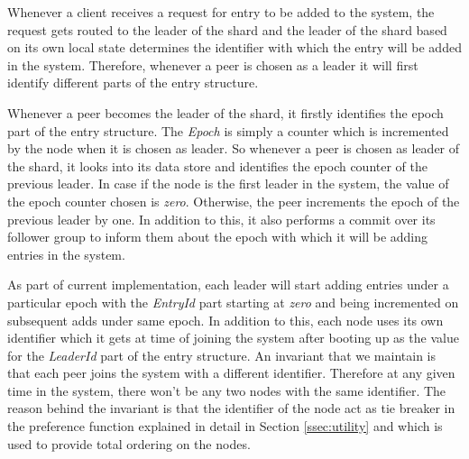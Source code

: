 \documentclass[a4paper,11pt]{kth-mag}
\begin{document}
Whenever a client receives a request for entry to be added to the system, the request gets routed to the leader of the shard and the leader of the shard based on its own local state determines the identifier with which the entry will be added in the system. Therefore, whenever a peer is chosen as a leader it will first identify different parts of the entry structure.
\par Whenever a peer becomes the leader of the shard, it firstly identifies the epoch part of the entry structure. The \textit{Epoch} is simply a counter which is incremented by the node when it is chosen as leader. So whenever a peer is chosen as leader of the shard, it looks into its data store and identifies the epoch counter of the previous leader. In case if the node is the first leader in the system, the value of the epoch counter chosen is \textit{zero}. Otherwise, the peer increments the epoch of the previous leader by one. In addition to this, it also performs a commit over its follower group to inform them about the epoch with which it will be adding entries in the system.
\par As part of current implementation, each leader will start adding entries under a particular epoch with the \textit{EntryId} part starting at \textit{zero} and being incremented on subsequent adds under same epoch. In addition to this, each node uses its own identifier which it gets at time of joining the system after booting up as the value for the \textit{LeaderId} part of the entry structure.  An invariant that we maintain is that each peer joins the system with a different identifier. Therefore at any given time in the system, there won't be any two nodes with the same  identifier. The reason behind the invariant is that the identifier of the node act as tie breaker in the preference function explained in detail in Section \ref{ssec:utility} and which is used to provide total ordering on the nodes.
\end{document}
